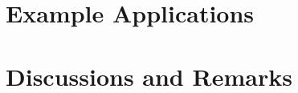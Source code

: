 \section{Example Applications}
\label{sec:example-applications}

\section{Discussions and Remarks}
\label{sec:discussions}

